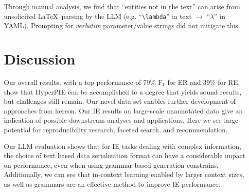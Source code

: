 Through manual analysis, we find that ``entities not in the text'' can arise from unsolicited \LaTeX\ parsing by the LLM (e.g. ``\verb|\lambda|'' in text $\rightarrow$ ``$\lambda$'' in YAML). Prompting for \emph{verbatim} parameter/value strings did not mitigate this.







\section{Discussion}\label{sec:discussion}

Our overall results, with a top performance of 79\% $\text{F}_1$ for ER and 39\% for RE, show that HyperPIE can be accomplished to a degree that yields sound results, but challenges still remain. Our novel data set enables further development of approaches from hereon. Our IE results on large-scale unannotated data give an indication of possible downstream analyses and applications. Here we see large potential for reproducibility research, faceted search, and recommendation.

Our LLM evaluation shows that for IE tasks dealing with complex information, the choice of text based data serialization format can have a considerable impact on performance, even when using grammar based generation constrains. Additionally, we can see that in-context learning enabled by larger context sizes, as well as grammars 
are an effective method to improve IE performance.
%

